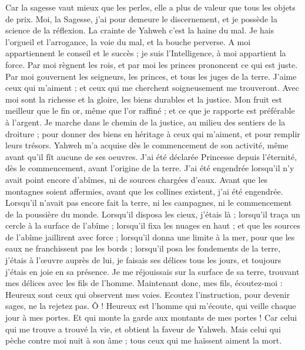 \begin{multicols}{2}
Car la sagesse vaut mieux que les perles, elle a plus de valeur que tous les objets de prix.
Moi, la Sagesse, j’ai pour demeure le discernement, et je possède la science de la réflexion.
La crainte de Yahweh c'est la haine du mal. Je hais l'orgueil et l'arrogance, la voie du mal, et la bouche perverse.
A moi appartiennent le conseil et le succès ; je suis l’Intelligence, à moi appartient la force.
Par moi règnent les rois, et par moi les princes prononcent ce qui est juste.
Par moi gouvernent les seigneurs, les princes, et tous les juges de la terre.
J'aime ceux qui m'aiment ; et ceux qui me cherchent soigneusement me trouveront.
Avec moi sont la richesse et la gloire, les biens durables et la justice.
Mon fruit est meilleur que le fin or, même que l'or raffiné ; et ce que je rapporte est préférable à l'argent.
Je marche dans le chemin de la justice, au milieu des sentiers de la droiture ;
pour donner des biens en héritage à ceux qui m'aiment, et pour remplir leurs trésors.
Yahweh m'a acquise dès le commencement de son activité, même avant qu'il fît aucune de ses oeuvres.
J'ai été déclarée Princesse depuis l’éternité, dès le commencement, avant l’origine de la terre.
J'ai été engendrée lorsqu'il n'y avait point encore d'abîmes, ni de sources chargées d'eaux.
Avant que les montagnes soient affermies, avant que les collines existent, j’ai été engendrée.
Lorsqu'il n'avait pas encore fait la terre, ni les campagnes, ni le commencement de la poussière du monde.
Lorsqu’il disposa les cieux, j’étais là ; lorsqu’il traça un cercle à la surface de l’abîme ;
lorsqu’il fixa les nuages en haut ; et que les sources de l’abîme jaillirent avec force ;
lorsqu’il donna une limite à la mer, pour que les eaux ne franchissent pas les bords ; lorsqu’il posa les fondements de la terre,
j’étais à l’œuvre auprès de lui, je faisais ses délices tous les jours, et toujours j'étais en joie en sa présence.
Je me réjouissais sur la surface de sa terre, trouvant mes délices avec les fils de l’homme.
Maintenant donc, mes fils, écoutez-moi : Heureux sont ceux qui observent mes voies.
Ecoutez l'instruction, pour devenir sages, ne la rejetez pas.
Ô ! Heureux est l'homme qui m'écoute, qui veille chaque jour à mes portes. Et qui monte la garde aux montants de mes portes !
Car celui qui me trouve a trouvé la vie, et obtient la faveur de Yahweh.
Mais celui qui pèche contre moi nuit à son âme ; tous ceux qui me haïssent aiment la mort.

\end{multicols}
